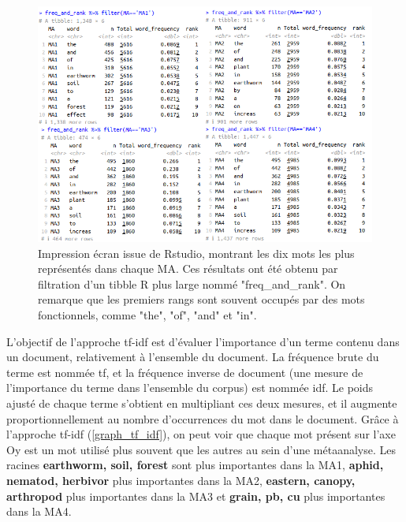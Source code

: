 \documentclass{book}
\begin{document}
\begin{figure}[htb] %
    \begin{center} %
        \includegraphics[width=1\textwidth]{word_rank_table.png}
        \caption[Liste des mots les plus représentées pour chaque métaanalyse]{Impression écran issue de Rstudio, montrant les dix mots les plus représentés dans chaque MA. Ces résultats ont été obtenu par filtration d'un tibble R plus large nommé "freq\_and\_rank". On remarque que les premiers rangs sont souvent occupés par des mots fonctionnels, comme "the", "of", "and" et "in".\label{rank_table}}
    \end{center}  
\end{figure}
\FloatBarrier{} %

L'objectif de l'approche tf-idf est d'évaluer l'importance d'un terme contenu dans un document, relativement à l'ensemble du document. La fréquence brute du terme est nommée tf, et la fréquence inverse de document (une mesure de l'importance du terme dans l'ensemble du corpus) est nommée idf. Le poids ajusté de chaque terme s'obtient en multipliant ces deux mesures, et il augmente proportionnellement au nombre d'occurrences du mot dans le document. Grâce à l'approche tf-idf (\cref{graph_tf_idf}), on peut voir que chaque mot présent sur l'axe Oy est un mot utilisé plus souvent que les autres au sein d'une métaanalyse. Les racines \textbf{earthworm, soil, forest} sont plus importantes dans la MA1, \textbf{aphid, nematod, herbivor} plus importantes dans la MA2, \textbf{eastern, canopy, arthropod} plus importantes dans la MA3 et \textbf{grain, pb, cu} plus importantes dans la MA4.
\end{document}
